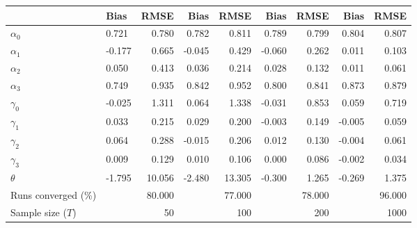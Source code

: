
\begin{tabular}[t]{llrrrrrrr}
\toprule
  & Bias & RMSE & Bias & RMSE & Bias & RMSE & Bias & RMSE\\
\midrule
$\alpha_{0}$ & 0.721 & 0.780 & 0.782 & 0.811 & 0.789 & 0.799 & 0.804 & 0.807\\
$\alpha_{1}$ & -0.177 & 0.665 & -0.045 & 0.429 & -0.060 & 0.262 & 0.011 & 0.103\\
$\alpha_{2}$ & 0.050 & 0.413 & 0.036 & 0.214 & 0.028 & 0.132 & 0.011 & 0.061\\
$\alpha_{3}$ & 0.749 & 0.935 & 0.842 & 0.952 & 0.800 & 0.841 & 0.873 & 0.879\\
$\gamma_{0}$ & -0.025 & 1.311 & 0.064 & 1.338 & -0.031 & 0.853 & 0.059 & 0.719\\
$\gamma_{1}$ & 0.033 & 0.215 & 0.029 & 0.200 & -0.003 & 0.149 & -0.005 & 0.059\\
$\gamma_{2}$ & 0.064 & 0.288 & -0.015 & 0.206 & 0.012 & 0.130 & -0.004 & 0.061\\
$\gamma_{3}$ & 0.009 & 0.129 & 0.010 & 0.106 & 0.000 & 0.086 & -0.002 & 0.034\\
$\theta$ & -1.795 & 10.056 & -2.480 & 13.305 & -0.300 & 1.265 & -0.269 & 1.375\\
Runs converged (\%) &  & 80.000 &  & 77.000 &  & 78.000 &  & 96.000\\
Sample size ($T$) &  & 50 &  & 100 &  & 200 &  & 1000\\
\bottomrule
\end{tabular}
